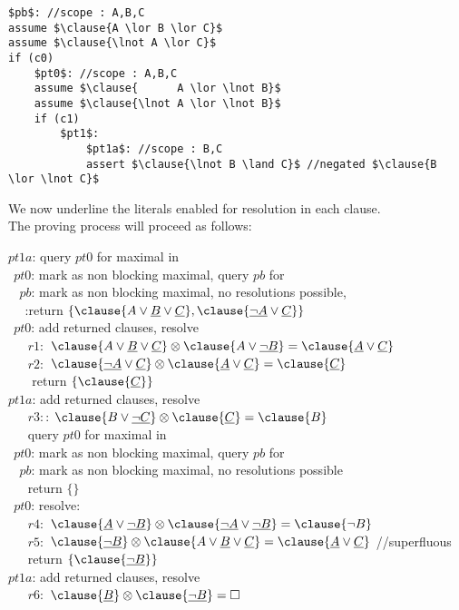 \begin{lstlisting}[mathescape]
$pb$: //scope : A,B,C
assume $\clause{A \lor B \lor C}$
assume $\clause{\lnot A \lor C}$
if (c0)
	$pt0$: //scope : A,B,C
	assume $\clause{      A \lor \lnot B}$
	assume $\clause{\lnot A \lor \lnot B}$
	if (c1)
		$pt1$: 
			$pt1a$: //scope : B,C
			assert $\clause{\lnot B \land C}$ //negated $\clause{B \lor \lnot C}$
\end{lstlisting}

We now underline the literals enabled for resolution in each clause.\\
The proving process will proceed as follows:

\noindent
$pt1a$: query $pt0$ for  maximal in \\
$~~pt0$: mark  as non blocking maximal, query $pb$ for  \\
$~~~~pb$: mark  as non blocking maximal, no resolutions possible, \\
$~~~~~~$:return $\{\clause{A \lor \underline{B} \lor \underline{C}}, \clause{\underline{\lnot A} \lor \underline{C}}\}$\\
$~~pt0$: add returned clauses, resolve \\
$~~~~~~~r1:$ $\clause{A \lor \underline{B} \lor \underline{C}} \otimes \clause{A \lor \underline{\lnot B}} = \clause{\underline{A} \lor \underline{C}}$ \\
$~~~~~~~r2:$ $\clause{\underline{\lnot A} \lor \underline{C}} \otimes \clause{\underline{A} \lor \underline{C}} = \clause{\underline{C}}$ \\
$~~~~~~~$	return $\{\clause{\underline{C}}\}$\\
$pt1a$: add returned clauses, resolve \\
$~~~~~~~r3:$: $\clause{B \lor \underline{\lnot C}} \otimes \clause{\underline{C}} = \clause{B}$ \\
$~~~~~~~$query $pt0$ for  maximal in \\
$~~pt0$: mark  as non blocking maximal, query $pb$ for  \\
$~~~~pb$: mark  as non blocking maximal, no resolutions possible \\
$~~~~~~~$return $\{\}$\\
$~~pt0$: resolve:\\
$~~~~~~~r4:$ $\clause{\underline{A} \lor \underline{\lnot B}} \otimes \clause{\underline{\lnot A} \lor \underline{\lnot B}} = \clause{\lnot B}$ \\
$~~~~~~~r5:$ $\clause{\underline{\lnot B}} \otimes \clause{A \lor \underline{B} \lor \underline{C}} = \clause{\underline{A}\lor \underline{C}}$ //superfluous\\
$~~~~~~~$return $\{\clause{\underline{\lnot B}}\}$\\
$pt1a$: add returned clauses, resolve \\
$~~~~~~~r6:$ $\clause{\underline{B}} \otimes \clause{\underline{\lnot B}} = \square$
	
